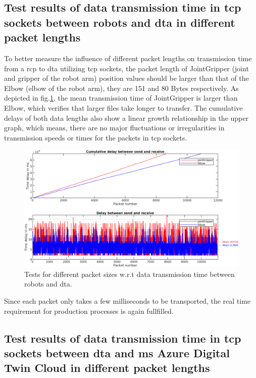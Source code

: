 \subsection{Test results of data transmission time in \gls{tcp} sockets between robots and \gls{dta} 
in different packet lengths} \label{chap: Result-RCP-DTA}

To better measure the influence of different packet lengths on transmission time from 
a \gls{rcp} to \gls{dta} utilizing 
\gls{tcp} sockets, 
the packet length of JointGripper (joint and gripper of the robot arm) position values should 
be larger than that of the Elbow (elbow of the robot arm), they are 151 and 80 Bytes respectively. 
As depicted in 
fig.\ref{fig: SR-JointGripper-Elbow}, the mean transmission time of JointGripper is larger 
than Elbow, which verifies that larger files take longer to transfer. The cumulative delays of 
both data lengths also show a linear growth relationship 
in the upper graph, which means, there are no major fluctuations or irregularities 
in transmission speeds or times for the packets in \gls{tcp} sockets. 


\begin{figure}[htb]
    \includegraphics[width=\textwidth]{figures/tests/DT/Delay_SendReceive_JointGripper_Elbow.png}
    \centering
    \caption{Tests for different packet sizes w.r.t data transmission time between robots 
    and \gls{dta}. \label{fig: SR-JointGripper-Elbow}}
\end{figure}

Since each packet only takes a few milliseconds to be transported, the real time requirement 
for production processes is again fullfilled. 



\subsection{Test results of data transmission time in \gls{tcp} sockets between \gls{dta} 
and \gls{ms} Azure Digital Twin Cloud in different packet lengths} \label{chap: Result-DTA-DT}

